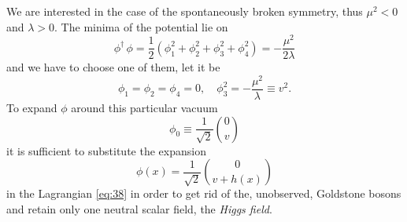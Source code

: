 We are interested in the case of the spontaneously broken symmetry,
thus $\mu^{2} < 0$ and $\lambda > 0$. The minima of the potential lie
on
\begin{equation}
  \label{eq:40}
  \phi^{\dagger}\,\phi = \frac{1}{2} (\phi_{1}^{2} + \phi_{2}^{2} +
  \phi_{3}^{2} + \phi_{4}^{2}) = - \frac{\mu^{2}}{2 \lambda}
\end{equation}
and we have to choose one of them, let it be
\begin{equation}
  \label{eq:41}
  \phi_{1} = \phi_{2} = \phi_{4} = 0, \quad \phi_{3}^{2} = -
  \frac{\mu^{2}}{\lambda} \equiv v^{2}.
\end{equation}
To expand $\phi$ around this particular vacuum
\begin{equation}
  \label{eq:42}
  \phi_{0} \equiv \frac{1}{\sqrt{2}} \binom{0}{v}
\end{equation}
it is sufficient to substitute the expansion
\begin{equation}
  \label{eq:43}
  \phi (x) = \frac{1}{\sqrt{2}} \binom{0}{v + h(x)}
\end{equation}
in the Lagrangian \eqref{eq:38} in order to get rid of the,
unobserved, Goldstone bosons and retain only one neutral scalar field,
the \emph{Higgs field}.


